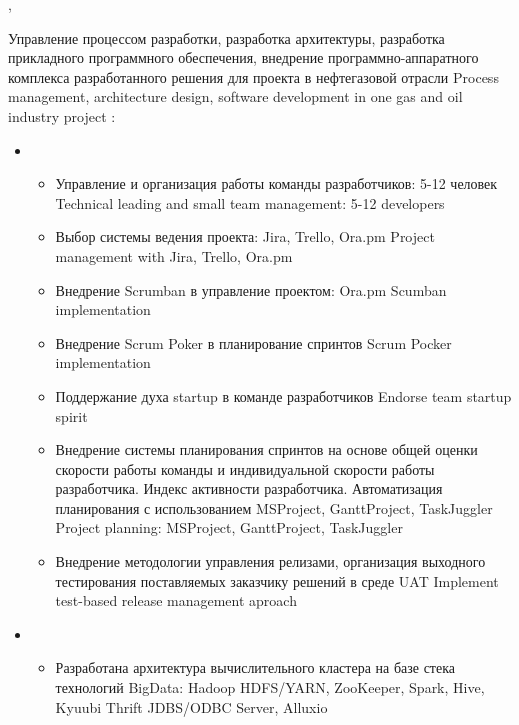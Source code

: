 \documentclass[11pt,a4paper,sans]{moderncv}        %
\begin{document}
{\protect{}}
{\cityspb, \country}
{}
{
	{Управление процессом разработки, разработка архитектуры, разработка прикладного программного обеспечения, внедрение программно-аппаратного комплекса разработанного решения для проекта в нефтегазовой отрасли}
	{Process management, architecture design, software development in one gas and oil industry project}
	\newline{}
	\achievements:
	\begin{itemize}
		\item {}
		\begin{itemize}
			\item {}
				{Управление и организация работы команды разработчиков: 5-12 человек}
				{Technical leading and small team management: 5-12 developers}
			\item {}
				{Выбор системы ведения проекта: Jira, Trello, Ora.pm}
				{Project management with Jira, Trello, Ora.pm}
			\item {}
				{Внедрение Scrumban в управление проектом: Ora.pm}
				{Scumban implementation}
			\item {}
				{Внедрение Scrum Poker в планирование спринтов}
				{Scrum Pocker implementation}
			\item {}
				{Поддержание духа startup в команде разработчиков}
				{Endorse team startup spirit}
			\item {}
				{Внедрение системы планирования спринтов на основе общей оценки скорости работы команды и индивидуальной скорости работы разработчика. Индекс активности разработчика. Автоматизация планирования с использованием MSProject, GanttProject, TaskJuggler}
				{Project planning: MSProject, GanttProject, TaskJuggler}
			\item {}
				{Внедрение методологии управления релизами, организация выходного тестирования поставляемых заказчику решений в среде UAT}
				{Implement test-based release management aproach}
		\end{itemize}
		\item {}
		\begin{itemize}
			\item {}
				{Разработана архитектура вычислительного кластера на базе стека технологий BigData: Hadoop HDFS/YARN, ZooKeeper, Spark, Hive, Kyuubi Thrift JDBS/ODBC Server, Alluxio}

\end{itemize}
\end{itemize}}
\end{document}
